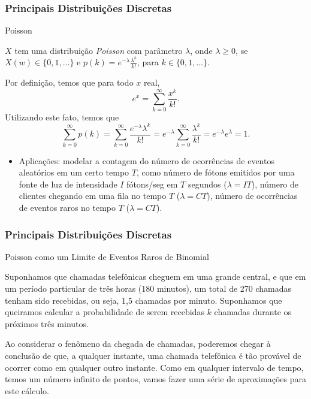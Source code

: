 \begin{frame}
\frametitle{\textbf{Principais Distribuições Discretas}}
\baselineskip=13pt
\begin{block}{Poisson}

$X$ tem uma distribuição {\em
Poisson} com parâmetro $\lambda$, onde $\lambda \geq 0$, se $X(w)\in
\{0,1,\ldots\}$ e $p(k)=e^{-\lambda}\frac{\lambda^k}{k!}$, para
$k\in\{0,1,\ldots\}$.

Por definição, temos que para todo $x$ real,
$$e^x=\sum_{k=0}^{\infty}\frac{x^k}{k!}.$$
Utilizando este fato, temos que
$$\sum_{k=0}^{\infty}p(k)=\sum_{k=0}^{\infty}\frac{e^{-\lambda}\lambda^k}{k!}=e^{-\lambda}\sum_{k=0}^{\infty}\frac{\lambda^k}{k!}=e^{-\lambda}e^{\lambda}=1.$$

\begin{itemize}

\item Aplicações: modelar a
contagem do número de ocorrências de eventos aleatórios em um certo
tempo $T$, como número de fótons emitidos por uma fonte de luz de
intensidade $I$ fótons/seg em $T$ segundos ($\lambda=IT$), número de
clientes chegando em uma fila no tempo $T$ ($\lambda= C T$), número
de ocorrências de eventos raros no tempo $T$ ($\lambda=C T$).

\end{itemize}

\end{block}
\end{frame}
%
\begin{frame}
\frametitle{\textbf{Principais Distribuições Discretas}}
\baselineskip=13pt
\begin{block}{Poisson como um Limite de Eventos Raros de Binomial}

Suponhamos que chamadas telefônicas cheguem em uma grande central, e
que em um período particular de três horas (180 minutos), um total
de 270 chamadas tenham sido recebidas, ou seja, 1,5 chamadas por
minuto. Suponhamos que queiramos calcular a probabilidade de serem
recebidas $k$ chamadas durante os próximos três minutos.

\medskip

Ao considerar o fenômeno da chegada de chamadas, poderemos chegar à
conclusão de que, a qualquer instante, uma chamada telefônica é tão
provável de ocorrer como em qualquer outro instante. Como em
qualquer intervalo de tempo, temos um número infinito de pontos,
vamos fazer uma série de aproximações para este cálculo.

\end{block}
\end{frame}

